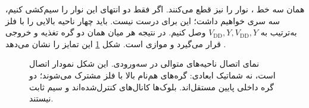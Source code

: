 همان سه خط ، نوار  را نیز قطع می‌کنند.
اگر فقط دو انتهای این نوار را سیم‌کشی کنیم، سه  سری خواهیم داشت؛
این برای  درست نیست. باید چهار ناحیه بالایی را با فلز به‌ترتیب
به \(V_{\mathrm{DD}},Y,V_{\mathrm{DD}},Y\) وصل کنیم.
در نتیجه هر  میان همان دو گره تغذیه و خروجی قرار می‌گیرد و موازی است.
شکل \ref{fig:layout-nand-chain} این تمایز را نشان می‌دهد
\cite[شکل ]{weste}.

\begin{figure}[ht]
\centering
\begin{latin}
\end{latin}
\caption{نمای اتصال ناحیه‌های متوالی  در  سه‌ورودی.
این شکل نمودار اتصال است، نه شماتیک ابعادی: گره‌های هم‌نام بالا با فلز مشترک
می‌شوند؛ دو گره داخلی پایین مستقل‌اند. بلوک‌ها کانال‌های کنترل‌شده‌اند و سیم ثابت نیستند.}
\label{fig:layout-nand-chain}
\end{figure}

